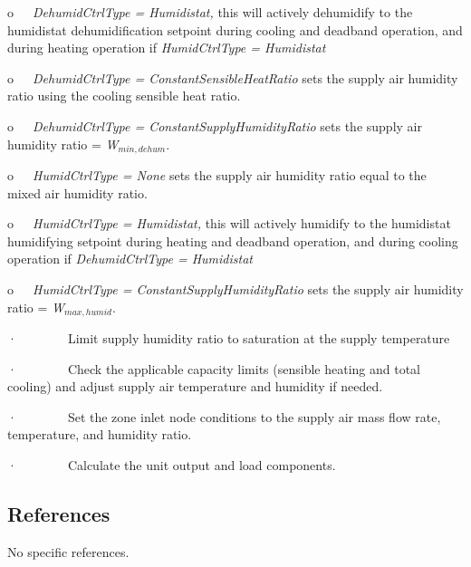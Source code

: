 o~~~\emph{DehumidCtrlType = Humidistat,} this will actively dehumidify to the humidistat dehumidification setpoint during cooling and deadband operation, and during heating operation if \emph{HumidCtrlType = Humidistat}

o~~~\emph{DehumidCtrlType = ConstantSensibleHeatRatio} sets the supply air humidity ratio using the cooling sensible heat ratio.

o~~~\emph{DehumidCtrlType = ConstantSupplyHumidityRatio} sets the supply air humidity ratio = \emph{W\(_{min,dehum}\)}.

o~~~\emph{HumidCtrlType = None} sets the supply air humidity ratio equal to the mixed air humidity ratio.

o~~~\emph{HumidCtrlType = Humidistat,} this will actively humidify to the humidistat humidifying setpoint during heating and deadband operation, and during cooling operation if \emph{DehumidCtrlType = Humidistat}

o~~~\emph{HumidCtrlType = ConstantSupplyHumidityRatio} sets the supply air humidity ratio = \emph{W\(_{max,humid}\)}.

·~~~~~~~~Limit supply humidity ratio to saturation at the supply temperature

·~~~~~~~~Check the applicable capacity limits (sensible heating and total cooling) and adjust supply air temperature and humidity if needed.

·~~~~~~~~Set the zone inlet node conditions to the supply air mass flow rate, temperature, and humidity ratio.

·~~~~~~~~Calculate the unit output and load components.

\subsection{References}\label{references-029}

No specific references.
